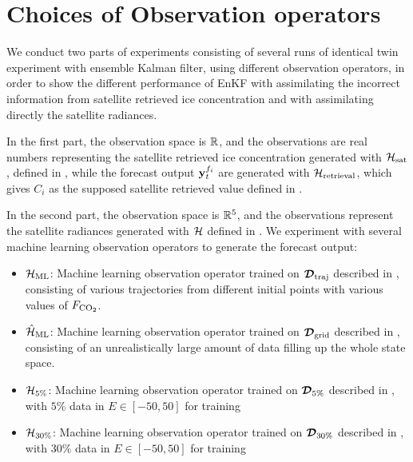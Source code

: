 \section{Choices of Observation operators}
\par We conduct two parts of experiments consisting of several runs of identical twin experiment with ensemble Kalman filter, using different observation operators, in order to show the different performance of EnKF with assimilating the incorrect information from satellite retrieved ice concentration and with assimilating directly the satellite radiances.
\par In the first part, the observation space is $\mathbb{R}$, and the observations are real numbers representing the satellite retrieved ice concentration generated with $\mathcal{H}_{\text{sat}}$, defined in , while the forecast output $\textbf{y}_t^{f_i}$ are generated with $\mathcal{H}_{\text{retrieval}}$, which gives $C_i$ as the supposed satellite retrieved value defined in .
\par In the second part,  the observation space is $\mathbb{R}^5$, and the observations represent the satellite radiances generated with $\mathcal{H}$ defined in . We experiment with several machine learning observation operators to generate the forecast output:
\begin{itemize}
\item $\mathcal{H}_{\text{ML}}$: Machine learning observation operator trained on $\bm{\mathcal{D}}_{\text{traj}}$ described in , consisting of various trajectories from different initial points with various values of $F_{\text{CO}_2}$.
\item $\hat{\mathcal{H}}_{\text{ML}}$: Machine learning observation operator trained on $\bm{\mathcal{D}}_{\text{grid}}$ described in , consisting of an unrealistically large amount of data filling up the whole state space.
\item $\mathcal{H}_{5\%}$: Machine learning observation operator trained on $\bm{\mathcal{D}}_{5\%}$ described in , with $5\%$ data in $E\in[-50,50]$ for training
\item $\mathcal{H}_{30\%}$: Machine learning observation operator trained on $\bm{\mathcal{D}}_{30\%}$ described in , with $30\%$ data in $E\in[-50,50]$ for training
\end{itemize}

